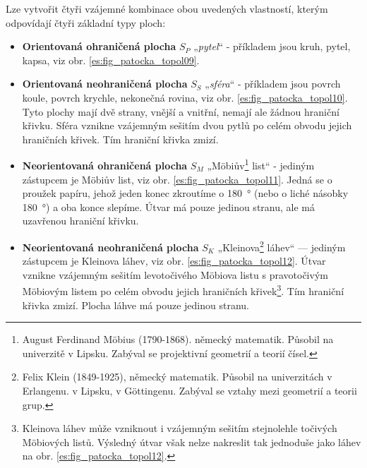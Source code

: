       Lze vytvořit čtyři vzájemné kombinace obou uvedených vlastností, kterým odpovídají čtyři      
      základní typy ploch:
      \begin{itemize}\addtolength{\itemsep}{-0.5\baselineskip}
        \item \textbf{Orientovaná ohraničená plocha} \(S_P\) „\emph{pytel}“ - příkladem jsou kruh, 
              pytel, kapsa, viz obr. \ref{es:fig_patocka_topol09}.
        \item \textbf{Orientovaná neohraničená plocha} \(S_S\) „\emph{sféra}“ - příkladem jsou 
              povrch koule, povrch krychle, nekonečná rovina, viz obr. 
              \ref{es:fig_patocka_topol10}. Tyto plochy mají dvě strany, vnější a vnitřní, nemají 
              ale žádnou hraniční křivku. Sféra vznikne vzájemným sešitím dvou pytlů po celém 
              obvodu jejich hraničních křivek. Tím hraniční křivka zmizí.      
        \item \textbf{Neorientovaná ohraničená plocha} \(S_M\) „Möbiův\footnote{August Ferdinand 
              Möbius (1790-1868). německý matematik. Působil na univerzitě v Lipsku. Zabýval se 
              projektivní geometrií a teorií čísel.} list“ - jediným zástupcem je Möbiův list, viz 
              obr. \ref{es:fig_patocka_topol11}. Jedná se o proužek papíru, jehož jeden konec 
              zkroutíme o \SI{180}{\degree} (nebo o liché násobky \SI{180}{\degree}) 
              a oba konce slepíme. Útvar má pouze jedinou stranu, ale má uzavřenou hraniční křivku.
        \item \textbf{Neorientovaná neohraničená plocha} \(S_K\) „Kleinova\footnote{Felix Klein 
              (1849-1925), německý matematik. Působil na univerzitách v Erlangenu. v Lipsku, v 
              Göttingenu. Zabýval se vztahy mezi geometrií a teorii grup.} láhev“ — jediným 
              zástupcem je Kleinova láhev, viz obr. \ref{es:fig_patocka_topol12}. Útvar vznikne 
              vzájemným sešitím levotočivého Möbiova listu s pravotočivým Möbiovým listem po celém 
              obvodu jejich hraničních křivek\footnote{Kleinova láhev může vzniknout i vzájemným 
              sešitím stejnolehle točivých Möbiových listů. Výsledný útvar však nelze 
              nakreslit tak jednoduše jako láhev na obr. \ref{es:fig_patocka_topol12}.}. Tím 
              hraniční křivka zmizí. Plocha láhve má pouze jedinou stranu.
    \end{itemize}
